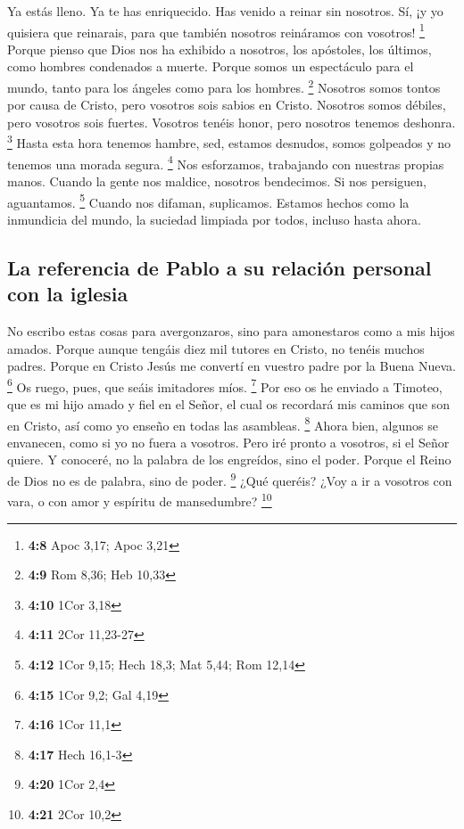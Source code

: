  Ya estás lleno. Ya te has enriquecido. Has venido a
reinar sin nosotros. Sí, ¡y yo quisiera que reinarais, para que también
nosotros reináramos con vosotros! \footnote{\textbf{4:8} Apoc 3,17; Apoc
  3,21}  Porque pienso que Dios nos ha exhibido a
nosotros, los apóstoles, los últimos, como hombres condenados a muerte.
Porque somos un espectáculo para el mundo, tanto para los ángeles como
para los hombres. \footnote{\textbf{4:9} Rom 8,36; Heb 10,33}
 Nosotros somos tontos por causa de Cristo, pero vosotros
sois sabios en Cristo. Nosotros somos débiles, pero vosotros sois
fuertes. Vosotros tenéis honor, pero nosotros tenemos deshonra.
\footnote{\textbf{4:10} 1Cor 3,18}  Hasta esta hora
tenemos hambre, sed, estamos desnudos, somos golpeados y no tenemos una
morada segura. \footnote{\textbf{4:11} 2Cor 11,23-27} 
Nos esforzamos, trabajando con nuestras propias manos. Cuando la gente
nos maldice, nosotros bendecimos. Si nos persiguen, aguantamos.
\footnote{\textbf{4:12} 1Cor 9,15; Hech 18,3; Mat 5,44; Rom 12,14}
 Cuando nos difaman, suplicamos. Estamos hechos como la
inmundicia del mundo, la suciedad limpiada por todos, incluso hasta
ahora.

\hypertarget{la-referencia-de-pablo-a-su-relaciuxf3n-personal-con-la-iglesia}{%
\subsection{La referencia de Pablo a su relación personal con la
iglesia}\label{la-referencia-de-pablo-a-su-relaciuxf3n-personal-con-la-iglesia}}

 No escribo estas cosas para avergonzaros, sino para
amonestaros como a mis hijos amados.  Porque aunque
tengáis diez mil tutores en Cristo, no tenéis muchos padres. Porque en
Cristo Jesús me convertí en vuestro padre por la Buena Nueva.
\footnote{\textbf{4:15} 1Cor 9,2; Gal 4,19}  Os ruego,
pues, que seáis imitadores míos. \footnote{\textbf{4:16} 1Cor 11,1}
 Por eso os he enviado a Timoteo, que es mi hijo amado y
fiel en el Señor, el cual os recordará mis caminos que son en Cristo,
así como yo enseño en todas las asambleas. \footnote{\textbf{4:17} Hech
  16,1-3}  Ahora bien, algunos se envanecen, como si yo
no fuera a vosotros.  Pero iré pronto a vosotros, si el
Señor quiere. Y conoceré, no la palabra de los engreídos, sino el poder.
 Porque el Reino de Dios no es de palabra, sino de poder.
\footnote{\textbf{4:20} 1Cor 2,4}  ¿Qué queréis? ¿Voy a
ir a vosotros con vara, o con amor y espíritu de mansedumbre?
\footnote{\textbf{4:21} 2Cor 10,2}

